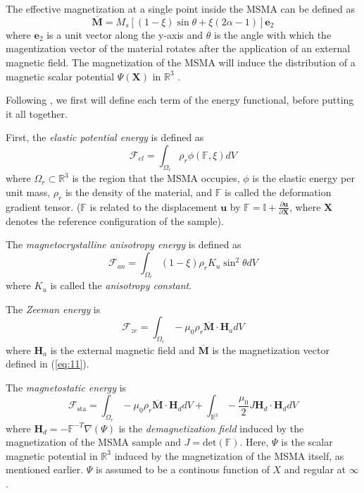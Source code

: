 \begin{multicols}{2}
The effective magnetization at a single point inside the MSMA can be defined as
\begin{equation} \label{eq:11}
    \overline{\textbf{M}} = M_{s}\left[(1-\xi)\sin\theta + \xi(2\alpha -1)\right]\textbf{e}_{2}
\end{equation}
where $\textbf{e}_{2}$ is a unit vector along the y-axis and $\theta$ is the angle with which the magentization vector of the material rotates after the application of an external magnetic field. The magnetization of the MSMA will induce the distribution of a magnetic scalar potential $\Psi(\textbf{X})$ in $\mathbb{R}^{3}$ \cite{wang2012variational}.

Following \cite{wang2012variational}, we first will define each term of the energy functional, before putting it all together.

First, the \textit{elastic potential energy} is defined as
\begin{equation} \label{eq:12}
    \mathcal{F}_{el} = \int_{\Omega_{r}}\rho_{r}\phi(\mathbb{F}, \xi)dV
\end{equation}
where $\Omega_{r} \subset \mathbb{R}^{3}$ is the region that the MSMA occupies, $\phi$ is the elastic energy per unit mass, $\rho_{r}$ is the density of the material, and $\mathbb{F}$ is called the deformation gradient tensor. ($\mathbb{F}$ is related to the displacement $\mathbf{u}$ by $\mathbb{F} = \mathbb{I} + \frac{\partial\mathbf{u}}{\partial\mathbf{X}}$, where $\mathbf{X}$ denotes the reference configuration of the sample).

The \textit{magnetocrystalline anisotropy energy} is defined as
\begin{equation} \label{eq:13}
    \mathcal{F}_{an} = \int_{\Omega_{r}} \left(1-\xi\right)\rho_{r}K_{u}\sin^{2}\theta dV
\end{equation}
where $K_{u}$ is called the \textit{anisotropy constant}.

The \textit{Zeeman energy} is
\begin{equation} \label{eq:14}
    \mathcal{F}_{ze} = \int_{\Omega_{r}} -\mu_{0}\rho_{r}\overline{\textbf{M}} \cdot \textbf{H}_{a} dV
\end{equation}
where $\textbf{H}_{a}$ is the external magnetic field and $\overline{\textbf{M}}$ is the magnetization vector defined in (\ref{eq:11}).

The \textit{magnetostatic energy} is
\begin{equation} \label{eq:15}
    \mathcal{F}_\mathrm{sta} = \int_{\Omega_{r}}-\mu_{0}\rho_{r}\overline{\textbf{M}} \cdot \textbf{H}_{d} dV + \int_{\mathbb{R}^{3}}-\frac{\mu_{0}}{2} J \textbf{H}_{d}\cdot \textbf{H}_{d} dV
\end{equation}
where $\textbf{H}_{d} = -\mathbb{F}^{-T}  \nabla(\Psi)$ is the \textit{demagnetization field} induced by the magnetization of the MSMA sample and $J = \text{det}(\mathbb{F})$. Here, $\Psi$ is the scalar magnetic potential in $\mathbb{R}^{3}$ induced by the magnetization of the MSMA itself, as mentioned earlier. $\Psi$ is assumed to be a continous function of $X$ and regular at $\infty$.


\end{multicols}
